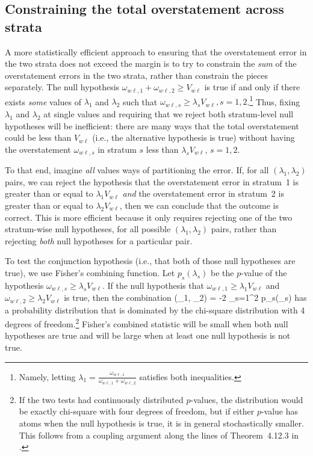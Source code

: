 \subsection{Constraining the total overstatement across strata}
A more statistically efficient approach to ensuring that the overstatement error in the 
two strata does not
exceed the margin is to try to constrain the \emph{sum} of the overstatement errors in the two
strata, rather than constrain the pieces separately.
The null hypothesis $\omega_{w\ell, 1} + \omega_{w\ell, 2} \ge V_{w\ell}$ is true if and only if there exists \textit{some}
values of $\lambda_1$ and $\lambda_2$ such that $\omega_{w\ell, s}\ge \lambda_s V_{w\ell}, s=1, 2$.\footnote{
Namely, letting $\lambda_1 = \frac{\omega_{w\ell, 1}}{\omega_{w\ell, 1}+\omega_{w\ell, 2}}$ satisfies both inequalities.
}
Thus, fixing $\lambda_1$ and $\lambda_2$ at single values and requiring that we reject both stratum-level null hypotheses 
will be inefficient:
there are many ways that the total overstatement could be less than $V_{w\ell}$ (i.e., the alternative hypothesis is true) without
having the overstatement $\omega_{w\ell,s}$ in stratum $s$ less than $\lambda_s V_{w\ell}$, $s = 1, 2$.

To that end, imagine \emph{all} values ways of partitioning the error.
If, for all $(\lambda_1, \lambda_2)$ pairs, we can reject the hypothesis that the 
overstatement error in stratum~1 is greater than or equal to $\lambda_1 V_{w\ell}$ \emph{and} 
the overstatement error in stratum~2 is greater than or equal to $\lambda_2 V_{w\ell}$, then
we can conclude that the outcome is correct.
This is more efficient because it only requires rejecting one of the two stratum-wise null hypotheses,
for all possible $(\lambda_1, \lambda_2)$ pairs,
rather than rejecting \textit{both} null hypotheses for a particular pair.

To test the conjunction hypothesis (i.e., that both of those null hypotheses are true), we use 
Fisher's combining function.
Let $p_s(\lambda_s)$ be the $p$-value of the hypothesis $\omega_{w\ell,s} \ge \lambda_s V_{w\ell}$.
If the null hypothesis that $\omega_{w\ell,1} \ge \lambda_1 V_{w\ell}$ and 
$\omega_{w\ell,2} \ge \lambda_2 V_{w\ell}$ is true, then the combination
\beq
   \chi(\lambda_1, \lambda_2) = -2 \sum_{s=1}^2 \ln p_s(\lambda_s)
\eeq
has a probability distribution that is dominated by the chi-square distribution with 4 degrees
of freedom.\footnote{%
   If the two tests had continuously distributed $p$-values, the distribution would be exactly
   chi-square with four degrees of freedom, but if either $p$-value has atoms when
   the null hypothesis is true, it is in general stochastically smaller.
   This follows from a coupling argument along the lines of Theorem~4.12.3 in \citet{grimmett01}.
}
Fisher's combined statistic will be small when both null hypotheses are true and will be large when
at least one null hypothesis is not true.

